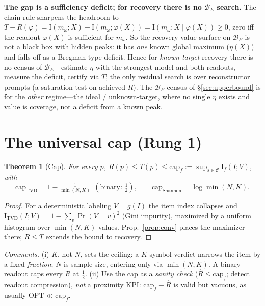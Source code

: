 \documentclass[11pt]{article}
\newtheorem{theorem}{Theorem}
\newcommand{\Iv}{\mathrm{I}}
\newcommand{\TVD}{\mathrm{TVD}}
\newcommand{\Bset}{\mathcal{B}_E}
\newcommand{\Cspace}{\mathcal{C}}
\newcommand{\Mw}{m_\omega}
\begin{document}
\textbf{The gap is a sufficiency deficit; for recovery there is no $\Bset$ search.} The chain rule sharpens the
headroom to $T-R(\varphi)=\Iv(\Mw;X)-\Iv(\Mw;\varphi(X))=\Iv(\Mw;X\mid\varphi(X))\ge0$, zero iff the readout
$\varphi(X)$ is sufficient for $\Mw$. So the recovery value-surface on $\Bset$ is not a black box with hidden
peaks: it has \emph{one} known global maximum ($\eta(X)$) and falls off as a Bregman-type deficit. Hence for
\emph{known-target} recovery there is no census of $\Bset$---estimate $\eta$ with the strongest model and
both-readouts, measure the deficit, certify via $T$; the only residual search is over reconstructor prompts (a
saturation test on achieved $R$). The $\Bset$ census of \S\ref{sec:upperbound} is for the \emph{other}
regime---the ideal / unknown-target, where no single $\eta$ exists and value is coverage, not a deficit from a
known peak.

\section{The universal cap (Rung 1)}\label{sec:cap}

\begin{theorem}[Cap]
For every $p$, $R(p)\le T(p)\le\mathrm{cap}_f:=\sup_{s\in\Cspace}\Iv_f(I;V)$, with
\[
\mathrm{cap}_{\TVD}=1-\tfrac1{\min(N,K)}\ \ (\text{binary: }\tfrac12),\qquad
\mathrm{cap}_{\mathrm{Shannon}}=\log\min(N,K).
\]
\end{theorem}
\begin{proof}
For a deterministic labeling $V=g(I)$ the item index collapses and
$\Iv_{\TVD}(I;V)=1-\sum_v\Pr(V{=}v)^2$ (Gini impurity), maximized by a uniform histogram over $\min(N,K)$
values. Prop.~\ref{prop:conv} places the maximizer there; $R\le T$ extends the bound to recovery.
\end{proof}

\noindent\emph{Comments.} (i) $K$, not $N$, sets the ceiling: a $K$-symbol verdict narrows the item by a
fixed \emph{fraction}; $N$ is sample size, entering only via $\min(N,K)$. A binary readout caps every $R$
at $\tfrac12$. (ii) Use the cap as a \emph{sanity check} ($\widehat R\le\mathrm{cap}_f$; detect readout
compression), \emph{not} a proximity KPI: $\mathrm{cap}_f-\widehat R$ is valid but vacuous, as usually
$\mathrm{OPT}\ll\mathrm{cap}_f$.
\end{document}
